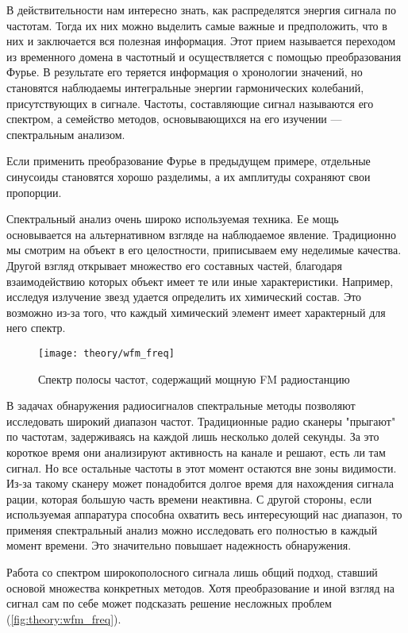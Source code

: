 В действительности нам интересно знать, как распределятся энергия сигнала по частотам. Тогда их них можно выделить самые важные и предположить, что в них и заключается вся полезная информация. Этот прием называется переходом из временного домена в частотный и осуществляется с помощью преобразования Фурье. В результате его теряется информация о хронологии значений, но становятся наблюдаемы интегральные энергии гармонических колебаний, присутствующих в сигнале. Частоты, составляющие сигнал называются его спектром, а семейство методов, основывающихся на его изучении --- спектральным анализом.

Если применить преобразование Фурье в предыдущем примере, отдельные синусоиды становятся хорошо разделимы, а их амплитуды сохраняют свои пропорции.

Спектральный анализ очень широко используемая техника. Ее мощь основывается на альтернативном взгляде на наблюдаемое явление. Традиционно мы смотрим на объект в его целостности, приписываем ему неделимые качества. Другой взгляд открывает множество его составных частей, благодаря взаимодействию которых объект имеет те или иные характеристики. Например, исследуя излучение звезд удается определить их химический состав. Это возможно из-за того, что каждый химический элемент имеет характерный для него спектр.

\begin{figure}[h]
  \centering
  \texttt{[image: theory/wfm\_freq]}
  \caption{Спектр полосы частот, содержащий мощную FM радиостанцию}
  \label{fig:theory:wfm_freq}
\end{figure}

В задачах обнаружения радиосигналов спектральные методы позволяют исследовать широкий диапазон частот. Традиционные радио сканеры "прыгают" по частотам, задерживаясь на каждой лишь несколько долей секунды. За это короткое время они анализируют активность на канале и решают, есть ли там сигнал. Но все остальные частоты в этот момент остаются вне зоны видимости. Из-за такому сканеру может понадобится долгое время для нахождения сигнала рации, которая большую часть времени неактивна. С другой стороны, если используемая аппаратура способна охватить весь интересующий нас диапазон, то применяя спектральный анализ можно исследовать его полностью в каждый момент времени. Это значительно повышает надежность обнаружения.

Работа со спектром широкополосного сигнала лишь общий подход, ставший основой множества конкретных методов. Хотя преобразование и иной взгляд на сигнал сам по себе может подсказать решение несложных проблем (\autoref{fig:theory:wfm_freq}).


